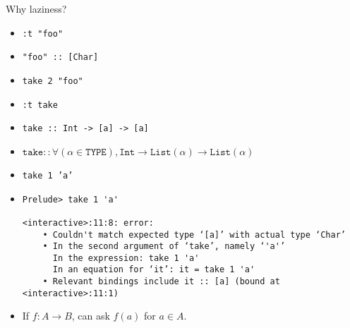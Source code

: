 \documentclass[8pt]{beamer}
\newcommand{\raw}[1]{\texttt{#1}}
\newcommand{\hs}[1]{\texttt{#1}}
\begin{document}
\begin{frame}[fragile]{Why laziness?}
\begin{itemize}
\item \raw{:t "foo"} \pause
\item \hs{"foo" :: [Char]}
\item \hs{take 2 "foo"} \pause
\item \raw{:t take}
\item \hs{take :: Int -> [a] -> [a]} \pause
\item $\texttt{take} :: \forall (\alpha \in \texttt{TYPE}), \texttt{Int} \rightarrow \texttt{List}(\alpha) \rightarrow \texttt{List}(\alpha)$\pause
\item \hs{take 1 'a'} \pause
\item
\begin{verbatim}
Prelude> take 1 'a'

<interactive>:11:8: error:
    • Couldn't match expected type ‘[a]’ with actual type ‘Char’
    • In the second argument of ‘take’, namely ‘'a'’
      In the expression: take 1 'a'
      In an equation for ‘it’: it = take 1 'a'
    • Relevant bindings include it :: [a] (bound at <interactive>:11:1)
\end{verbatim}
\pause
\item If $f: A \rightarrow B$, \pause can ask $f(a)$ for $a \in A$.
\end{itemize}
\end{frame}
\end{document}
